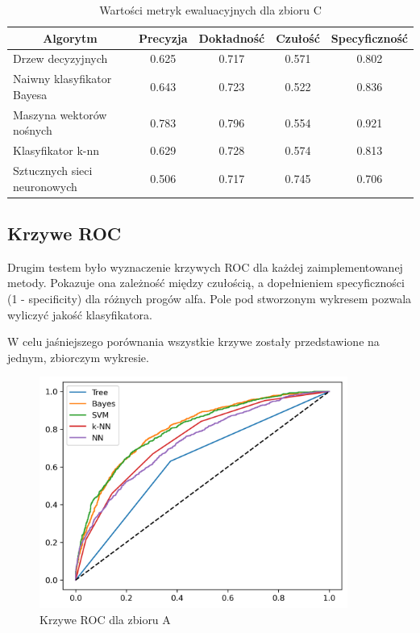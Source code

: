 \documentclass[a4paper,11pt]{article}
\begin{document}
\begin{table}[H]
\centering
\caption{Wartości metryk ewaluacyjnych dla zbioru C}
\label{tab:metrics_c}
\begin{tabular}{|l|c|c|c|c|}
\hline
\multicolumn{1}{|c|}{\textbf{Algorytm}} & \textbf{Precyzja} & \textbf{Dokładność} & \textbf{Czułość} & \textbf{Specyficzność} \\ \hline
Drzew decyzyjnych & 0.625 & 0.717 & 0.571 & 0.802 \\ \hline
Naiwny klasyfikator Bayesa & 0.643 & 0.723 & 0.522 & 0.836 \\ \hline
Maszyna wektorów nośnych & 0.783 & 0.796 & 0.554 & 0.921 \\ \hline
Klasyfikator k-nn & 0.629 & 0.728 & 0.574 & 0.813 \\ \hline
Sztucznych sieci neuronowych & 0.506 & 0.717 & 0.745 & 0.706 \\ \hline
\end{tabular}
\end{table}


\subsection{Krzywe ROC}
Drugim testem było wyznaczenie krzywych ROC dla każdej zaimplementowanej metody. Pokazuje ona zależność między czułością, a dopełnieniem specyficzności (1 - specificity) dla różnych progów alfa. Pole pod stworzonym wykresem pozwala wyliczyć jakość klasyfikatora. 
\par
W celu jaśniejszego porównania wszystkie krzywe zostały przedstawione na jednym, zbiorczym wykresie. 

\begin{figure}[H]
    \centering
    \includegraphics[width=0.90\textwidth]{images3/ROC_Curve_Rankeds.png}
    \caption{Krzywe ROC dla zbioru A}
    \label{fig:roc_curve_a}
\end{figure}
\end{document}
